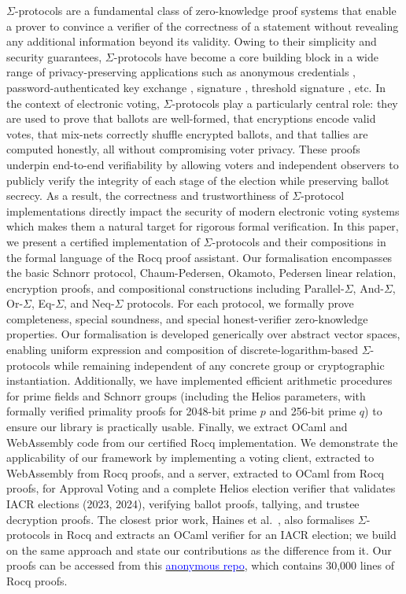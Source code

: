 \documentclass[sigconf,anonymous,review]{acmart}
\begin{document}
$\Sigma$-protocols are a fundamental class of zero-knowledge proof systems that enable a prover to convince a verifier of the correctness of a statement without revealing any additional information beyond its validity. Owing to their simplicity and security guarantees, $\Sigma$-protocols have become a core building block in a wide range of privacy-preserving applications such as anonymous credentials \cite{10.1145/2660267.2660328}, 
password-authenticated key exchange \cite{10.5555/2022815.2022838}, 
signature \cite{10.1007/0-387-34805-0_22}, threshold signature \cite{10.1007/978-3-030-81652-0_2}, etc. In the context of electronic voting, $\Sigma$-protocols play a particularly central role: they are used to prove that ballots are well-formed, that encryptions encode valid votes, that mix-nets correctly shuffle encrypted ballots, and that tallies are computed honestly, all without compromising voter privacy. These proofs underpin end-to-end verifiability by allowing voters and independent observers to publicly verify the integrity of each stage of the election while preserving ballot secrecy. As a result, the correctness and trustworthiness of $\Sigma$-protocol implementations directly impact the security of modern electronic voting systems which makes them a natural target for rigorous formal verification. In this paper, we present a certified implementation of $\Sigma$-protocols and their compositions in 
the formal language of the Rocq proof assistant. Our formalisation encompasses the basic Schnorr protocol, 
Chaum-Pedersen, Okamoto, Pedersen linear relation, encryption proofs, and compositional constructions including Parallel-$\Sigma$, 
And-$\Sigma$, Or-$\Sigma$, Eq-$\Sigma$, and Neq-$\Sigma$ protocols. For each protocol, we formally prove 
completeness, special soundness, and special honest-verifier zero-knowledge properties.
Our formalisation is developed 
generically over abstract vector spaces, enabling uniform expression and composition of discrete-logarithm-based 
$\Sigma$-protocols while remaining independent of any concrete group or cryptographic instantiation. Additionally, we have implemented efficient arithmetic procedures for prime fields and Schnorr groups (including the Helios parameters, 
with formally verified primality proofs for 2048-bit prime $p$ and 256-bit prime $q$) to 
ensure our library is practically usable. Finally, we extract OCaml and WebAssembly code from our certified 
Rocq implementation. We demonstrate the applicability of our framework by implementing a voting client, extracted to WebAssembly from Rocq proofs, and a server, extracted to OCaml from Rocq proofs, for Approval Voting and a complete Helios election verifier that validates IACR elections (2023, 2024), verifying ballot proofs, tallying, and trustee decryption proofs. The closest prior work, Haines et al.~\cite{287095}, also formalises $\Sigma$-protocols in Rocq and extracts an OCaml verifier for an IACR election; we build on the same approach and state our contributions as the difference from it. Our proofs can be accessed from this \href{https://anonymous.4open.science/r/SigmaProtocol-EBA5/README.md}{\textcolor{blue}{anonymous repo}}, which contains 30,000 lines of Rocq proofs.
\end{document}

